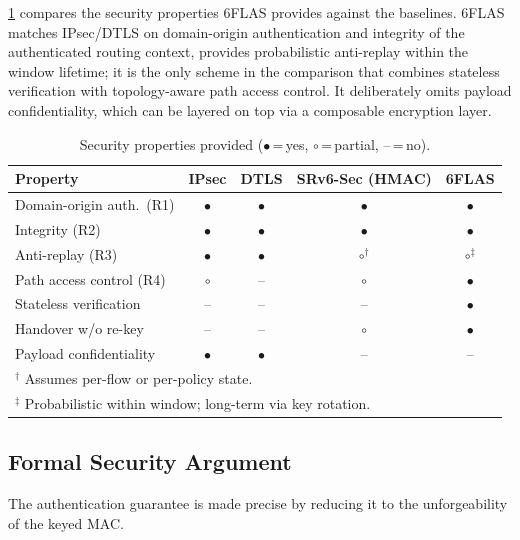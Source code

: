 \cref{tab:secprop} compares the security properties 6FLAS provides against the
baselines. 6FLAS matches IPsec/DTLS on domain-origin authentication and integrity of the authenticated routing context,
provides probabilistic anti-replay within the window lifetime; it is the only scheme in the comparison that combines stateless verification
with topology-aware path access control. It deliberately omits payload
confidentiality, which can be layered on top via a composable encryption layer.

\begin{table}[t]
\centering
\caption{Security properties provided ($\bullet$\,=\,yes, $\circ$\,=\,partial, --\,=\,no).}
\label{tab:secprop}
\renewcommand{\arraystretch}{1.2}
\setlength{\tabcolsep}{4pt}
\begin{tabular}{lcccc}
\toprule
\textbf{Property} & \textbf{IPsec} & \textbf{DTLS} & \textbf{SRv6-Sec (HMAC)} & \textbf{6FLAS} \\
\midrule
Domain-origin auth.\ (R1) & $\bullet$ & $\bullet$ & $\bullet$ & $\bullet$ \\
Integrity (R2)          & $\bullet$ & $\bullet$ & $\bullet$ & $\bullet$ \\
Anti-replay (R3)        & $\bullet$ & $\bullet$ & $\circ^\dagger$   & $\circ^\ddagger$ \\
Path access control (R4)& $\circ$   & --        & $\circ$   & $\bullet$ \\
Stateless verification  & --        & --        & --        & $\bullet$ \\
Handover w/o re-key      & --        & --        & $\circ$   & $\bullet$ \\
Payload confidentiality & $\bullet$ & $\bullet$ & --        & -- \\
\bottomrule
\multicolumn{5}{l}{\footnotesize $^\dagger$ Assumes per-flow or per-policy state.} \\
\multicolumn{5}{l}{\footnotesize $^\ddagger$ Probabilistic within window; long-term via key rotation.}
\end{tabular}
\end{table}

\subsection{Formal Security Argument}
\label{sec:formal}

The authentication guarantee is made precise by reducing it to the
unforgeability of the keyed MAC.

